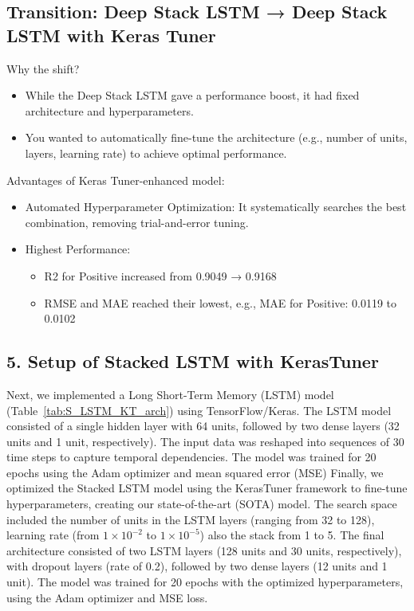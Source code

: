 \documentclass[letterpaper]{article}
\begin{document}
\subsection{Transition: Deep Stack LSTM → Deep Stack LSTM with Keras Tuner
}
Why the shift?
\begin{itemize}
    \item While the Deep Stack LSTM gave a performance boost, it had fixed architecture and hyperparameters.
    \item You wanted to automatically fine-tune the architecture (e.g., number of units, layers, learning rate) to achieve optimal performance.
\end{itemize}
Advantages of Keras Tuner-enhanced model:
\begin{itemize}
    \item Automated Hyperparameter Optimization: It systematically searches the best combination, removing trial-and-error tuning.
    \item Highest Performance:
    \begin{itemize}
        \item R2 for Positive increased from 0.9049 → 0.9168
        \item RMSE and MAE reached their lowest, e.g., MAE for Positive: 0.0119 to 0.0102
    \end{itemize}
\end{itemize}

\subsection{5. Setup of Stacked LSTM with KerasTuner}
Next, we implemented a Long Short-Term Memory (LSTM) model (Table~\ref{tab:S_LSTM_KT_arch}) using TensorFlow/Keras. The LSTM model consisted of a single hidden layer with 64 units, followed by two dense layers (32 units and 1 unit, respectively). The input data was reshaped into sequences of 30 time steps to capture temporal dependencies. The model was trained for 20 epochs using the Adam optimizer and mean squared error (MSE)
Finally, we optimized the Stacked LSTM model using the KerasTuner framework to fine-tune hyperparameters, creating our state-of-the-art (SOTA) model. The search space included the number of units in the LSTM layers (ranging from 32 to 128), learning rate (from $1 \times 10^{-2}$ to $1 \times 10^{-5}$) also the stack from 1 to 5. The final architecture consisted of two LSTM layers (128 units and 30 units, respectively), with dropout layers (rate of 0.2), followed by two dense layers (12 units and 1 unit). The model was trained for 20 epochs with the optimized hyperparameters, using the Adam optimizer and MSE loss.
\end{document}
